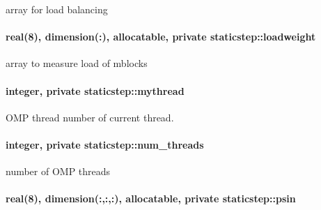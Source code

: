 array for load balancing 

\paragraph[{\texorpdfstring{loadweight}{loadweight}}]{\setlength{\rightskip}{0pt plus 5cm}real(8), dimension(\+:), allocatable, private staticstep\+::loadweight\hspace{0.3cm}{\ttfamily [private]}}\hypertarget{namespacestaticstep_a1986460549ea65bc38b06fa1dcca5c80}{}\label{namespacestaticstep_a1986460549ea65bc38b06fa1dcca5c80}


array to measure load of mblocks 

\paragraph[{\texorpdfstring{mythread}{mythread}}]{\setlength{\rightskip}{0pt plus 5cm}integer, private staticstep\+::mythread\hspace{0.3cm}{\ttfamily [private]}}\hypertarget{namespacestaticstep_a97ea4745bce5d66d8e1d52b1faab0961}{}\label{namespacestaticstep_a97ea4745bce5d66d8e1d52b1faab0961}


O\+MP thread number of current thread. 

\paragraph[{\texorpdfstring{num\+\_\+threads}{num_threads}}]{\setlength{\rightskip}{0pt plus 5cm}integer, private staticstep\+::num\+\_\+threads\hspace{0.3cm}{\ttfamily [private]}}\hypertarget{namespacestaticstep_a3a3097b03f69cc230a1cb4f99edfd657}{}\label{namespacestaticstep_a3a3097b03f69cc230a1cb4f99edfd657}


number of O\+MP threads 

\paragraph[{\texorpdfstring{psin}{psin}}]{\setlength{\rightskip}{0pt plus 5cm}real(8), dimension(\+:,\+:,\+:), allocatable, private staticstep\+::psin\hspace{0.3cm}{\ttfamily [private]}}\hypertarget{namespacestaticstep_afd576c66455f9e0537bf703b10a6a9eb}{}\label{namespacestaticstep_afd576c66455f9e0537bf703b10a6a9eb}


